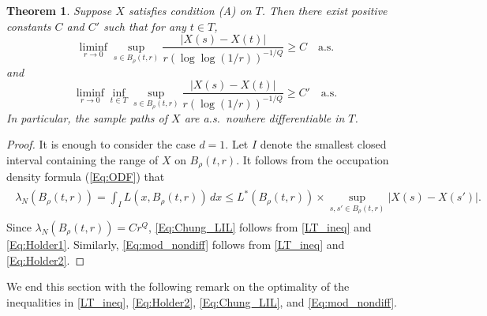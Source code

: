 \documentclass[11pt, reqno]{amsart}
\newtheorem{theorem}{Theorem}[section]
\numberwithin{equation}{section}
\begin{document}
\begin{theorem}\label{T:sample}
Suppose $X$ satisfies condition \textup{(A)} on $T$. %
Then there exist positive constants $C$ and $C'$ such that for any $t \in T$, 
\begin{equation}\label{Eq:Chung_LIL}
\liminf_{r \to 0} \sup_{s \in B_\rho(t, r)} \frac{|X(s) - X(t)|}{r (\log\log (1/r))^{-1/Q}} \ge C \quad \text{a.s.}
\end{equation}
and
\begin{equation}\label{Eq:mod_nondiff}
\liminf_{r \to 0} \inf_{t \in T} \sup_{s \in B_\rho(t, r)} \frac{|X(s) - X(t)|}{r (\log(1/r))^{-1/Q}} \ge C' \quad \text{a.s.}
\end{equation}
In particular, the sample paths of $X$ are a.s.~nowhere differentiable in $T$.
\end{theorem}

\begin{proof}
It is enough to consider the case $d = 1$.
Let $I$ denote the smallest closed interval containing the range of $X$ on $B_\rho(t, r)$. It follows from the 
occupation density formula (\ref{Eq:ODF}) that
\begin{align}
\begin{aligned}\label{LT_ineq}
\lambda_N(B_\rho(t, r)) = \int_I L(x, B_\rho(t, r)) \, dx
\le L^*(B_\rho(t, r)) \times \sup_{s, s' \in B_\rho(t, r)} |X(s) - X(s')|.
\end{aligned}
\end{align}
Since $\lambda_N(B_\rho(t, r)) = C r^Q$, \eqref{Eq:Chung_LIL} follows from \eqref{LT_ineq} and \eqref{Eq:Holder1}. 
Similarly, \eqref{Eq:mod_nondiff} follows from \eqref{LT_ineq} and \eqref{Eq:Holder2}.
\end{proof}

We end this section with the following remark on the optimality of the inequalities in \eqref{LT_ineq}, \eqref{Eq:Holder2},
 \eqref{Eq:Chung_LIL}, and \eqref{Eq:mod_nondiff}.
 
\end{document}
